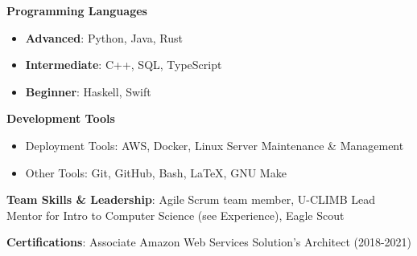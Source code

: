 \vspace{-2.0mm}


\begin{cventries}
\vspace{-5mm}
  \cventry
    {}
    {}
    {}
    {}
    {
      \begin{cvitems}
        \item {\textbf{Programming Languages}}
        \begin{itemize}
        \item \textbf{Advanced}: Python, Java, Rust
        \item \textbf{Intermediate}: C++, SQL, TypeScript
        \item \textbf{Beginner}: Haskell, Swift
        \end{itemize}
        \item {\textbf{Development Tools}}
        \begin{itemize}
        \item {Deployment Tools: AWS, Docker, Linux Server Maintenance \& Management}
        \item {Other Tools: Git, GitHub, Bash, \LaTeX, GNU Make}
        \end {itemize}
        \item {\textbf{Team Skills \& Leadership}: Agile Scrum team
            member, U-CLIMB Lead Mentor for Intro to Computer Science (see Experience),
    Eagle Scout}
          \item {\textbf{Certifications}: Associate Amazon Web Services Solution's Architect (2018-2021)}
      \end{cvitems}
    }
    {}
\end{cventries}
